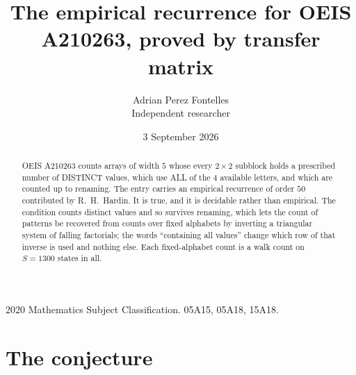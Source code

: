 \documentclass[11pt,a4paper]{article}
\title{The empirical recurrence for OEIS A210263, proved by transfer matrix}
\author{Adrian Perez Fontelles\\ \small Independent researcher}
\date{3 September 2026}
\theoremstyle{plain}
\theoremstyle{definition}
\begin{document}
\maketitle

\begin{abstract}
OEIS A210263 counts arrays of width $5$ whose every $2\times2$ subblock holds a
prescribed number of DISTINCT values, which use ALL of the $4$ available letters, and which
are counted up to renaming. The entry carries an empirical recurrence of order $50$
contributed by R.~H.~Hardin. It is true, and it is decidable rather than empirical. The
condition counts distinct values and so survives renaming, which lets the count of patterns be
recovered from counts over fixed alphabets by inverting a triangular system of falling
factorials; the words ``containing all values'' change which row of that inverse is used and
nothing else. Each fixed-alphabet count is a walk count on $S=1300$ states in all.
\end{abstract}

\noindent\small 2020 Mathematics Subject Classification. 05A15, 05A18, 15A18.\normalsize

\section{The conjecture}
\end{document}
